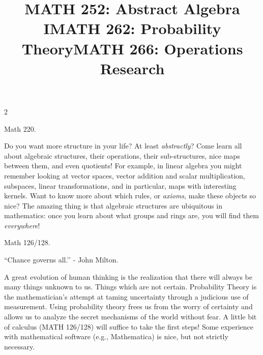 \documentclass[12pt]{article}
\newcommand{\bolder}{\textbf}
\begin{document}
\begin{multicols}{2}
\begin{tcolorbox}[colback=white, colframe=black]
    \begin{center}
    \title{{\large \bolder{MATH 252: Abstract Algebra I}}}
    \end{center}
\end{tcolorbox}

 Math 220.

Do you want more structure in your life? At least \textit{abstractly}? Come learn all about algebraic structures, their operations, their sub-structures, nice maps between them, and even quotients! For example, in linear algebra you might remember looking at vector spaces, vector addition and scalar multiplication, subspaces, linear transformations, and in particular, maps with interesting kernels. Want to know more about which rules, or \textit{axioms}, make these objects so nice? The amazing thing is that algebraic structures are ubiquitous in mathematics: once you learn about what groups and rings are, you will find them \textit{everywhere}!


\begin{tcolorbox}[colback=white, colframe=black]
    \begin{center}
    \title{{\large \bolder{MATH 262: Probability Theory}}}
    \end{center}
\end{tcolorbox}

 Math 126/128.

``Chance governs all.’’ -  John Milton.

A great evolution of human thinking is the realization that there will always be many things unknown to us.  Things which are not certain.  Probability Theory is the mathematician’s attempt at taming uncertainty through a judicious use of measurement.  Using probability theory frees us from the worry of certainty and allows us to analyze the secret mechanisms of the world without fear.   A little bit of calculus (MATH 126/128) will suffice to take the first steps!  Some experience with mathematical software (e.g., Mathematica) is nice, but not strictly necessary.


\begin{tcolorbox}[colback=white, colframe=black]
    \begin{center}
    \title{{\large \bolder{MATH 266: Operations Research}}}
    \end{center}
\end{tcolorbox}


\end{multicols}
\end{document}

